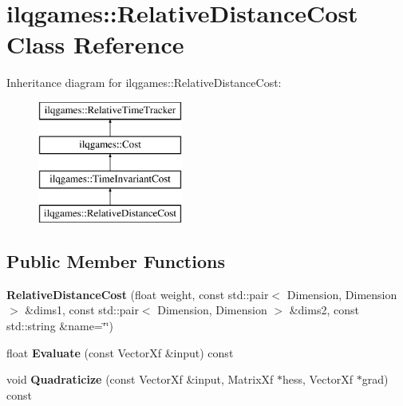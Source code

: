 \hypertarget{classilqgames_1_1_relative_distance_cost}{}\section{ilqgames\+:\+:Relative\+Distance\+Cost Class Reference}
\label{classilqgames_1_1_relative_distance_cost}
Inheritance diagram for ilqgames\+:\+:Relative\+Distance\+Cost\+:\begin{figure}[H]
\begin{center}
\leavevmode
\includegraphics[height=4.000000cm]{classilqgames_1_1_relative_distance_cost}
\end{center}
\end{figure}
\subsection*{Public Member Functions}
\begin{DoxyCompactItemize}
\item 
{\bfseries Relative\+Distance\+Cost} (float weight, const std\+::pair$<$ Dimension, Dimension $>$ \&dims1, const std\+::pair$<$ Dimension, Dimension $>$ \&dims2, const std\+::string \&name=\char`\"{}\char`\"{})\hypertarget{classilqgames_1_1_relative_distance_cost_a84e9246eebe137fd00c61e42d83e24a7}{}\label{classilqgames_1_1_relative_distance_cost_a84e9246eebe137fd00c61e42d83e24a7}

\item 
float {\bfseries Evaluate} (const Vector\+Xf \&input) const \hypertarget{classilqgames_1_1_relative_distance_cost_a3b74070916107dd182283160f55e595a}{}\label{classilqgames_1_1_relative_distance_cost_a3b74070916107dd182283160f55e595a}

\item 
void {\bfseries Quadraticize} (const Vector\+Xf \&input, Matrix\+Xf $\ast$hess, Vector\+Xf $\ast$grad) const \hypertarget{classilqgames_1_1_relative_distance_cost_acac35562946cfb47a5f8aeba65202fcb}{}\label{classilqgames_1_1_relative_distance_cost_acac35562946cfb47a5f8aeba65202fcb}

\end{DoxyCompactItemize}

